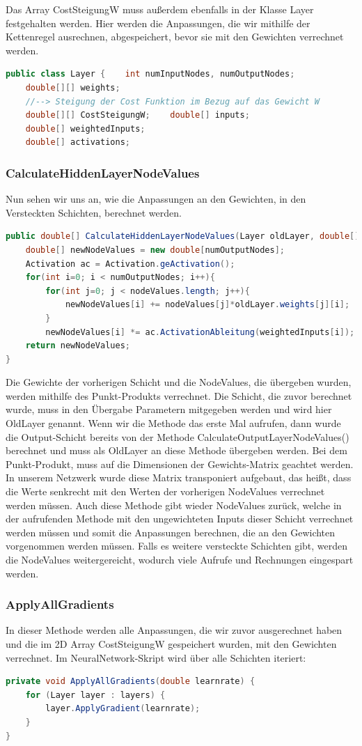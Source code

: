 \documentclass[12pt]{article}
\begin{document}
Das Array CostSteigungW muss außerdem ebenfalls in der Klasse Layer festgehalten werden. Hier werden die Anpassungen, die wir mithilfe der Kettenregel ausrechnen, abgespeichert, bevor sie mit den Gewichten verrechnet werden.\begin{lstlisting}[language=Java]
public class Layer {    int numInputNodes, numOutputNodes;
    double[][] weights;
    //--> Steigung der Cost Funktion im Bezug auf das Gewicht W
    double[][] CostSteigungW;    double[] inputs;
    double[] weightedInputs;
    double[] activations;
\end{lstlisting}
\subsubsection{CalculateHiddenLayerNodeValues}Nun sehen wir uns an, wie die Anpassungen an den Gewichten, in den Versteckten Schichten, berechnet werden.\begin{lstlisting}[language=Java]
public double[] CalculateHiddenLayerNodeValues(Layer oldLayer, double[] nodeValues) {
    double[] newNodeValues = new double[numOutputNodes];
    Activation ac = Activation.geActivation();
    for(int i=0; i < numOutputNodes; i++){
        for(int j=0; j < nodeValues.length; j++){
            newNodeValues[i] += nodeValues[j]*oldLayer.weights[j][i];
        } 
        newNodeValues[i] *= ac.ActivationAbleitung(weightedInputs[i]);
    return newNodeValues;
}
\end{lstlisting}
Die Gewichte der vorherigen Schicht und die NodeValues, die übergeben wurden, werden mithilfe des Punkt-Produkts verrechnet. Die Schicht, die zuvor berechnet wurde, muss in den Übergabe Parametern mitgegeben werden und wird hier OldLayer genannt. Wenn wir die Methode das erste Mal aufrufen, dann wurde die Output-Schicht bereits von der Methode CalculateOutputLayerNodeValues() berechnet und muss als OldLayer an diese Methode übergeben werden.
Bei dem Punkt-Produkt, muss auf die Dimensionen der Gewichts-Matrix geachtet werden. In unserem Netzwerk wurde diese Matrix transponiert aufgebaut, das heißt, dass die Werte senkrecht mit den Werten der vorherigen NodeValues verrechnet werden müssen. Auch diese Methode gibt wieder NodeValues zurück, welche in der aufrufenden Methode mit den ungewichteten Inputs dieser Schicht verrechnet werden müssen und somit die Anpassungen berechnen, die an den Gewichten vorgenommen werden müssen. Falls es weitere versteckte Schichten gibt, werden die NodeValues weitergereicht, wodurch viele Aufrufe und Rechnungen eingespart werden.\subsubsection{ApplyAllGradients}In dieser Methode werden alle Anpassungen, die wir zuvor ausgerechnet haben und die im 2D Array CostSteigungW gespeichert wurden, mit den Gewichten verrechnet. Im NeuralNetwork-Skript wird über alle Schichten iteriert:\begin{lstlisting}[language=Java]
private void ApplyAllGradients(double learnrate) {
    for (Layer layer : layers) {
        layer.ApplyGradient(learnrate);
    }
}
\end{lstlisting}
\end{document}
